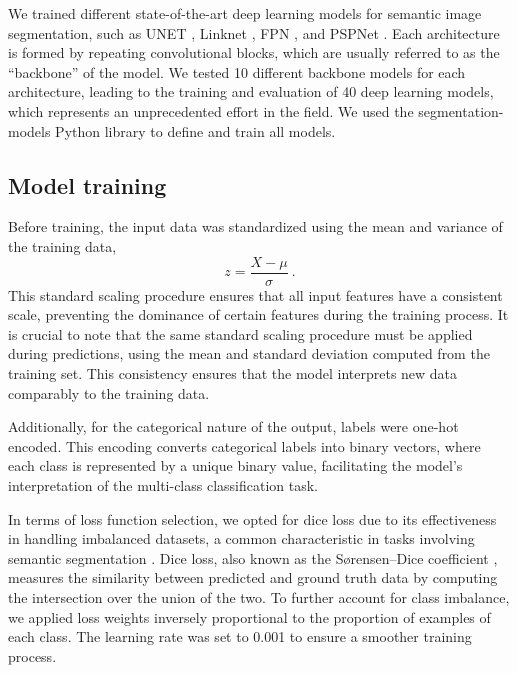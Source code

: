 We trained different state-of-the-art deep learning models for semantic image
segmentation, such as UNET \cite{Ronneberger2015}, Linknet
\cite{Chaurasia2017}, FPN \cite{Lin2017}, and PSPNet \cite{Zhao2017}. Each
architecture is formed by repeating convolutional blocks, which are usually
referred to as the ``backbone'' of the model. We tested 10 different backbone
models for each architecture, leading to the training and evaluation of 40 deep
learning models, which represents an unprecedented effort in the field. We
used the segmentation-models Python library \cite{segmentation_models} to
define and train all models.

\subsection{Model training}

Before training, the input data was standardized using the mean and variance of
the training data,
\begin{equation}
    z=\frac{X-\mu}{\sigma} \ .
\end{equation}
This standard scaling procedure ensures that all input features have a
consistent scale, preventing the dominance of certain features during the
training process. It is crucial to note that the same standard scaling
procedure must be applied during predictions, using the mean and standard
deviation computed from the training set. This consistency ensures that the
model interprets new data comparably to the training data.

Additionally, for the categorical nature of the output, labels were one-hot
encoded. This encoding converts categorical labels into binary vectors, where
each class is represented by a unique binary value, facilitating the model's
interpretation of the multi-class classification task.

In terms of loss function selection, we opted for dice loss due to its
effectiveness in handling imbalanced datasets, a common characteristic in tasks
involving semantic segmentation \cite{rahman2016optimizing}. Dice loss, also
known as the Sørensen–Dice coefficient \cite{sorensen1948method,
    dice1945measures}, measures the similarity between predicted and ground
truth data by computing the intersection over the union of the two. To further
account for class imbalance, we applied loss weights inversely proportional to
the proportion of examples of each class. The learning rate was set to 0.001 to
ensure a smoother training process.


